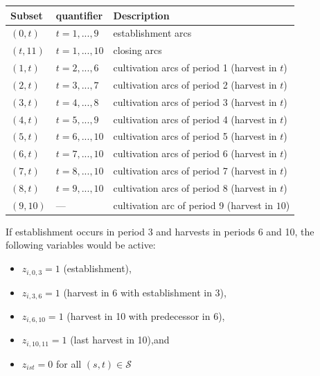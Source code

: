 \documentclass[
  11pt,
  11pt,
  a4paper]{article}
\providecommand{\tightlist}{%
  \setlength{\itemsep}{0pt}\setlength{\parskip}{0pt}}
\begin{document}
\begin{longtable}[]{@{}
  >{\raggedright\arraybackslash}p{}
  >{\raggedright\arraybackslash}p{}
  >{\raggedright\arraybackslash}p{}@{}}
\toprule\noalign{}
\begin{minipage}[b]{\linewidth}\raggedright
Subset
\end{minipage} & \begin{minipage}[b]{\linewidth}\raggedright
quantifier
\end{minipage} & \begin{minipage}[b]{\linewidth}\raggedright
Description
\end{minipage} \\
\midrule\noalign{}
\endhead
\bottomrule\noalign{}
\endlastfoot
\((0,t)\) & \(t = 1,...,9\) & establishment arcs \\
\((t,11)\) & \(t = 1,...,10\) & closing arcs \\
\((1,t)\) & \(t=2,...,6\) & cultivation arcs of period 1 (harvest in
\(t\)) \\
\((2,t)\) & \(t=3,...,7\) & cultivation arcs of period 2 (harvest in
\(t\)) \\
\((3,t)\) & \(t=4,...,8\) & cultivation arcs of period 3 (harvest in
\(t\)) \\
\((4,t)\) & \(t=5,...,9\) & cultivation arcs of period 4 (harvest in
\(t\)) \\
\((5,t)\) & \(t=6,...,10\) & cultivation arcs of period 5 (harvest in
\(t\)) \\
\((6,t)\) & \(t=7,...,10\) & cultivation arcs of period 6 (harvest in
\(t\)) \\
\((7,t)\) & \(t=8,...,10\) & cultivation arcs of period 7 (harvest in
\(t\)) \\
\((8,t)\) & \(t=9,...,10\) & cultivation arcs of period 8 (harvest in
\(t\)) \\
\((9,10)\) & --- & cultivation arc of period 9 (harvest in \(10\)) \\
\end{longtable}

If establishment occurs in period 3 and harvests in periods 6 and 10,
the following variables would be active:

\begin{itemize}
\tightlist
\item
  \(z_{i,0,3}=1\) (establishment),
\item
  \(z_{i,3,6}=1\) (harvest in 6 with establishment in 3),
\item
  \(z_{i,6,10}=1\) (harvest in 10 with predecessor in 6),
\item
  \(z_{i,10,11}=1\) (last harvest in 10),and
\item
  \(z_{ist}=0\) for all \((s,t) \in \mathcal{S}\)
\end{itemize}
\end{document}
